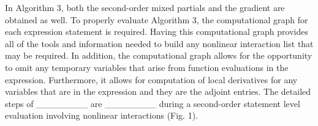 \documentclass[oneside]{article}
\begin{document}
\begin{algorithm*}[!htb]
\begin{algorithmic}[1]
\EndIf
\EndFor
\end{algorithmic}
 \end{algorithm*}

In Algorithm 3, both the second-order mixed partials and the gradient are obtained as well.  To properly evaluate Algorithm 3, the computational graph for each expression statement is required. Having this computational graph provides all of the tools and information needed to build any nonlinear interaction list that may be required. In addition, the computational graph allows for the opportunity to omit any temporary variables that arise from function evaluations in the expression. Furthermore, it allows for computation of local derivatives for any variables that are in the expression and they are the adjoint entries. The detailed steps of ________  are ________ during a second-order statement level evaluation involving nonlinear interactions (Fig. 1). \\
\\
\end{document}
